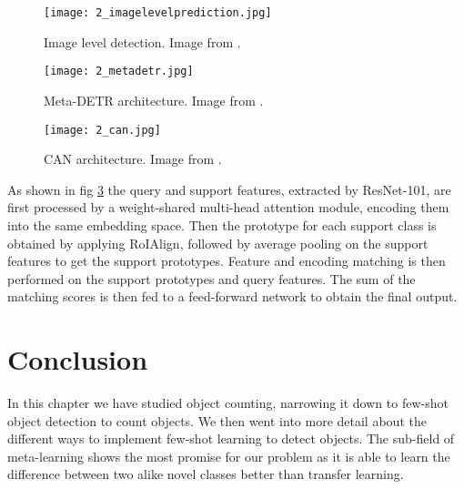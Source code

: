 \begin{figure}[h]
    \centering
    \texttt{[image: 2\_imagelevelprediction.jpg]}
    \caption{\label{fig:2_imagelevelprediction} Image level detection. Image from \citet{MetaDETR}.}
\end{figure}

\begin{figure}[h]
    \centering
    \texttt{[image: 2\_metadetr.jpg]}
    \caption{\label{fig:2_metadetr} Meta-DETR architecture. Image from \citet{MetaDETR}.}
\end{figure}

\begin{figure}[h]
    \centering
    \texttt{[image: 2\_can.jpg]}
    \caption{\label{fig:2_CAN} CAN architecture. Image from \citet{MetaDETR}.}
\end{figure}

As shown in fig \ref{fig:2_CAN} the query and support features, extracted by ResNet-101, are first processed by a weight-shared multi-head attention module, encoding them into the same embedding space. Then the prototype for each support class is obtained by applying RoIAlign, followed by average pooling on the support features to get the support prototypes. Feature and encoding matching is then performed on the support prototypes and query features. The sum of the matching scores is then fed to a feed-forward network to obtain the final output.

\section{Conclusion}
In this chapter we have studied object counting, narrowing it down to few-shot object detection to count objects. We then went into more detail about the different ways to implement few-shot learning to detect objects. The sub-field of meta-learning shows the most promise for our problem as it is able to learn the difference between two alike novel classes better than transfer learning.